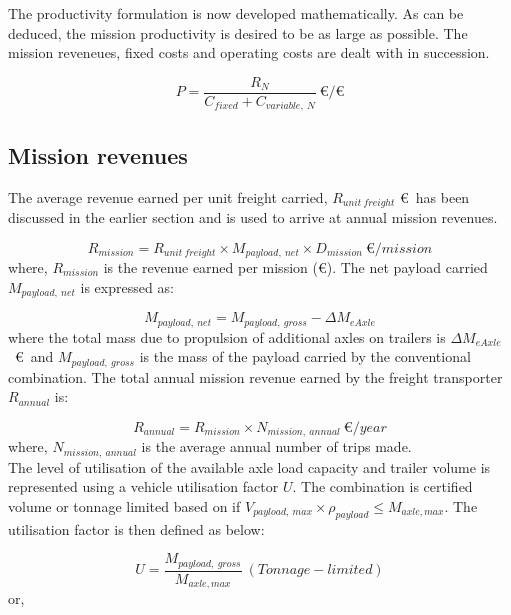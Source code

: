 \documentclass[ExampleMasters.tex]{subfiles}
\begin{document}
		The productivity formulation is now developed mathematically. As can be deduced, the mission productivity is desired to be as large as possible. The mission reveneues, fixed costs and operating costs are dealt with in succession.

		\begin{equation} \label{eq:productivity}
			P = \frac{R_N}{C_{fixed} + C_{variable,\ N}}\ \euro/\euro
		\end{equation}

		\subsection{Mission revenues}

		The average revenue earned per unit freight carried, $R_{unit\ freight}$ \euro \ has been discussed in the earlier section and is used to arrive at annual mission revenues.

		\begin{equation}
			R_{mission} = R_{unit\ freight} \times M_{payload,\ net} \times D_{mission} \  \euro / mission
		\end{equation}
		where, $R_{mission}$ is the revenue earned per mission (\euro). The net payload carried $M_{payload,\ net}$ is expressed as:

		\begin{equation}
			M_{payload,\ net} = M_{payload,\ gross} - \Delta M_{eAxle}
		\end{equation}
		where the total mass due to propulsion of additional axles on trailers is $\Delta M_{eAxle}$ \ \euro \ and $M_{payload,\ gross}$ is the mass of the payload carried by the conventional combination. The total annual mission revenue earned by the freight transporter $R_{annual}$ is:

		\begin{equation}
			R_{annual} = R_{mission} \times N_{mission,\ annual} \  \euro / year
		\end{equation}
		where, $N_{mission,\ annual}$ is the average annual number of trips made. \\

		The level of utilisation of the available axle load capacity and trailer volume is represented using a vehicle utilisation factor $U$. The combination is certified volume or tonnage limited based on if $V_{payload,\ max} \times \rho_{payload} \leq M_{axle, max}$. The utilisation factor is then defined as below:

		\begin{equation}
			U = \frac{M_{payload,\ gross}}{M_{axle,max}}\ (Tonnage-limited)
		\end{equation}
		or,
\end{document}
